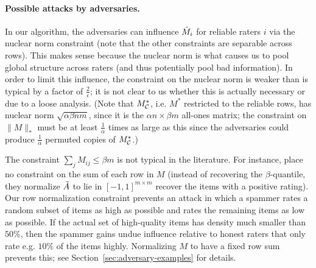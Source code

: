 \paragraph{Possible attacks by adversaries.} In our algorithm, 
the adversaries can influence $\tilde{M}_i$ for reliable raters $i$ via 
the nuclear norm constraint (note that the other constraints are 
separable across rows). This makes sense because 
the nuclear norm is what causes us to pool global structure across 
raters (and thus potentially pool bad information). In order to 
limit this influence, the constraint on the 
nuclear norm is weaker than is typical by a factor of $\frac{2}{\epsilon}$; 
it is not clear to us whether this is actually necessary or due to a 
loose analysis. (Note that $M_{\mathcal{C}}^*$, i.e. $M^*$ restricted to the 
reliable rows, 
has nuclear norm $\sqrt{\alpha\beta nm}$, since it is the 
$\alpha n \times \beta m$ all-ones matrix; the constraint on $\|M\|_*$ must 
be at least $\frac{1}{\alpha}$ times as large as this since the adversaries 
could produce $\frac{1}{\alpha}$ permuted copies of $M_{\mathcal{C}}^*$.)

The constraint $\sum_j M_{ij} \leq \beta m$ is 
not typical in the literature. For instance, \citep{chen2014improved} 
place no 
constraint on the sum of each row in $M$ (instead of recovering 
the $\beta$-quantile, they normalize $\tilde{A}$ to lie in $[-1,1]^{m \times m}$ recover 
the items with a positive rating).
Our row normalization constraint prevents an attack 
in which a spammer rates a random subset of items as high as possible and 
rates the remaining items as low as possible. If the actual set of 
high-quality items has density much smaller than $50\%$, then the 
spammer gains undue influence relative to honest raters that 
only rate e.g. $10\%$ of the items highly. Normalizing $M$ to 
have a fixed row sum prevents this; see Section~\ref{sec:adversary-examples} 
for details.
